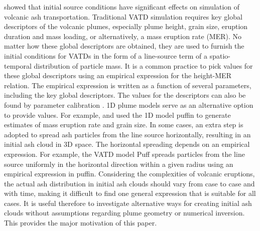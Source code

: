 \documentclass[draft,linenumbers]{agujournal2019}
\begin{document}
\citet{fero2009simulating, stohl2011determination} showed that initial source conditions have significant effects on simulation of volcanic ash transportation.  Traditional VATD simulation requires key global descriptors of the volcanic plumes, especially plume height, grain size, eruption duration and mass loading, or alternatively, a mass eruption rate (MER). No matter how these global descriptors are obtained, they are used to furnish the initial conditions for VATDs in the form of a line-source term of a spatio-temporal distribution of particle mass. It is a common practice to pick values for these global descriptors using an empirical expression for the height-MER relation. The empirical expression is written as a function of several parameters, including the key global descriptors.  The values for the descriptors can also be found by parameter calibration \citep[e.g.][]{fero2008simulation,fero2009simulating, stohl2011determination, zidikheri2017estimation}. 1D plume models serve as an alternative option to provide values. For example, \citet{bursik2012estimation} and \citet{stefanescu2014temporal} used the 1D model puffin \citep{bursik2001effect} to generate estimates of mass eruption rate and grain size.  In some cases, an extra step is adopted to spread ash particles from the line source horizontally, resulting in an initial ash cloud in 3D space.  The horizontal spreading depends on an empirical expression. For example, the VATD model Puff spreads particles from the line source uniformly in the horizontal direction within a given radius using an empirical expression in puffin.  Considering the complexities of volcanic eruptions, the actual ash distribution in initial ash clouds should vary from case to case and with time, making it difficult to find one general expression that is suitable for all cases. It is useful therefore to investigate alternative ways for creating initial ash clouds without assumptions regarding plume geometry or numerical inversion. This provides the  major motivation of this paper.
\end{document}
